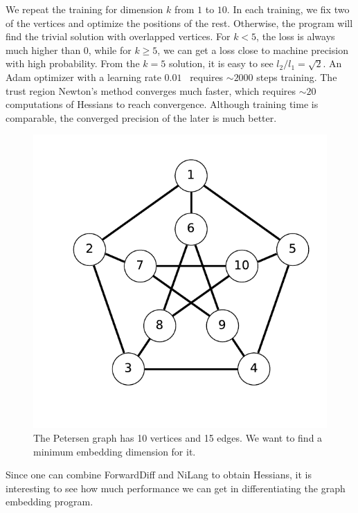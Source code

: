 \documentclass{article}
\newcommand{\<}{\langle}
\renewcommand{\>}{\rangle}
\theoremstyle{definition}\newtheorem{definition}{\textit{Definition}}
\begin{document}
We repeat the training for dimension $k$ from $1$ to $10$.
In each training, we fix two of the vertices and optimize the positions of the rest. Otherwise, the program will find the trivial solution with overlapped vertices. 
For $k < 5$, the loss is always much higher than $0$,
while for $k\geq5$, we can get a loss close to machine precision with high probability.
From the $k=5$ solution, it is easy to see $l_2/l_1 = \sqrt{2}$.
An Adam optimizer with a learning rate $0.01$~\cite{Kingma2014} requires $\sim2000$ steps training.
The trust region Newton's method converges much faster, which requires $\sim 20$ computations of Hessians to reach convergence.
Although training time is comparable, the converged precision of the later is much better.
\begin{figure}
    \centerline{\includegraphics[width=0.4\columnwidth,trim={0 1cm 0 0},clip]{petersen.pdf}}
    \caption{The Petersen graph has 10 vertices and 15 edges. We want to find a minimum embedding dimension for it.}\label{fig:petersen}
\end{figure}

Since one can combine ForwardDiff and NiLang to obtain Hessians,
it is interesting to see how much performance we can get in differentiating the graph embedding program.
\end{document}
